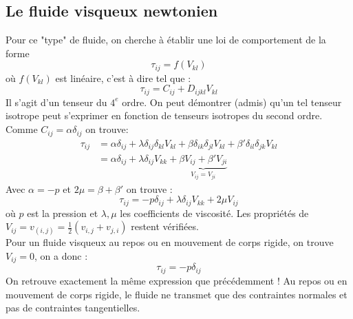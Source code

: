     
    \subsection{Le fluide visqueux newtonien}
    Pour ce "type" de fluide, on cherche à établir une loi de comportement de la forme 
    \begin{equation}
    \tau_{ij} = f(V_{kl})
    \end{equation}
    où $f(V_{kl})$ est linéaire, c'est à dire tel que :
    \begin{equation}
    \tau_{ij} = C_{ij} + D_{ijkl}V_{kl}
    \end{equation}
    Il s'agit d'un tenseur du $4^e$ ordre. On peut démontrer (admis) qu'un tel tenseur isotrope
    peut s'exprimer en fonction de tenseurs isotropes du second ordre. Comme $C_{ij} = \alpha
    \delta_{ij}$ on trouve:
    \begin{equation}
    \begin{array}{ll}
    \tau_{ij} &= \alpha\delta_{ij} + \lambda \delta_{ij}\delta_{kl}V_{kl} + \beta
    \delta_{ik}\delta_{jl}V_{kl} + \beta' \delta_{il}\delta_{jk}V_{kl}  \\
     &= \alpha\delta_{ij} + \lambda\delta_{ij}V_{kk} + \underbrace{\beta V_{ij} + \beta' 
     V_{ji}}_{V_{ij} = V_{ji}}
    \end{array}
    \end{equation}
    Avec $\alpha = -p$ et $2\mu = \beta + \beta'$ on trouve :
    \begin{equation}
    \tau_{ij} = -p\delta_{ij} + \lambda\delta_{ij}V_{kk} + 2\mu V_{ij}
    \label{eq:ComportementVisqNew}
    \end{equation}
    où $p$ est la pression et $\lambda,\mu$ les coefficients de viscosité. Les propriétés
    de $V_{ij} = v_{(i,j)} = \frac{1}{2}(v_{i,j}+v_{j,i})$ restent vérifiées.\\
    Pour un fluide visqueux au repos ou en mouvement de corps rigide, on trouve $V_{ij}=0$, 
    on a donc :
    \begin{equation}
    \tau_{ij} = -p\delta_{ij}
    \end{equation}
    On retrouve exactement la même expression que précédemment ! Au repos ou en mouvement 
    de corps rigide, le fluide ne transmet que des contraintes normales et pas de contraintes
    tangentielles.
    
